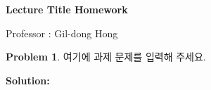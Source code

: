 \documentclass[11pt]{article}
\theoremstyle{definition}
\newtheorem{problem}{Problem}
\begin{document}
\begin{center}    
\huge{\textbf{Lecture Title Homework}}
\end{center}

\vspace{1mm}
\begin{flushright}
    Professor : Gil-dong Hong
\end{flushright}

\vspace{2mm}
\normalsize


\renewcommand{\theproblem}{1.23}
\begin{problem}
   여기에 과제 문제를 입력해 주세요.
\end{problem}

\noindent
\textbf{Solution:}
\end{document}
